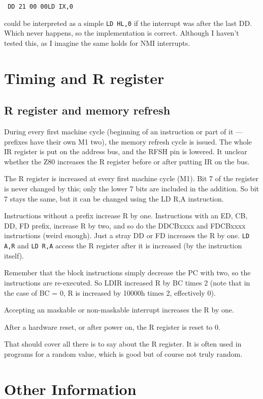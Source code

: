 \documentclass[oneside,a4paper]{book}
\begin{document}
{\tt
{\qquad}DD 21 00 00{\qquad}LD IX,0
}

could be interpreted as a simple {\tt LD HL,0} if the interrupt was after the 
last DD. Which never happens, so the implementation is correct.
Although I haven't tested this, as I imagine the same holds for NMI interrupts. 

\chapter{Timing and R register}

\section{R register and memory refresh}

During every first machine cycle (beginning of an instruction or part
of it --- prefixes have their own M1 two), the memory refresh cycle is
issued. The whole IR register is put on the address bus, and the RFSH pin is 
lowered.  It unclear whether the Z80 increases the R register before or after 
putting IR on the bus. 

The R register is increased at every first machine cycle (M1). Bit 7 of
the register is never changed by this; only the lower 7 bits are included
in the addition. So bit 7 stays the same, but it can be changed using the
{\ttfamily LD R,A} instruction.

Instructions without a prefix increase R by one. Instructions with an ED, CB,
DD, FD prefix, increase R by two, and so do the DDCBxxxx and FDCBxxxx 
instructions (weird enough). Just a stray DD or FD increases the R by
one. {\tt LD A,R} and {\tt LD R,A} access the R register after it is 
increased (by the instruction itself). 

Remember that the block instructions simply decrease the PC with two, so
the instructions are re-executed. So LDIR increased R by BC times 2 (note that
in the case of BC = 0, R is increased by 10000h times 2, effectively 0).

Accepting an maskable or non-maskable interrupt increases the R by one.

After a hardware reset, or after power on, the R register is reset to 0.

That should cover all there is to say about the R register. It is often
used in programs for a random value, which is good but of course not
truly random.

\chapter{Other Information}
\end{document}
